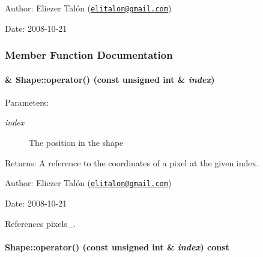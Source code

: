 \begin{Desc}
\item[Author:]Eliezer Talón (\href{mailto:elitalon@gmail.com}{\tt elitalon@gmail.com}) \end{Desc}
\begin{Desc}
\item[Date:]2008-10-21 \end{Desc}


\subsubsection{Member Function Documentation}
\hypertarget{class_shape_7d12f3a76e2bfb7963c00237eba41e0a}{
\paragraph[operator()]{ \& Shape::operator() (const unsigned int \& {\em index})}\hfill}
\label{class_shape_7d12f3a76e2bfb7963c00237eba41e0a}


\begin{Desc}
\item[Parameters:]
\begin{description}
\item[{\em index}]The position in the shape\end{description}
\end{Desc}
\begin{Desc}
\item[Returns:]A reference to the coordinates of a pixel at the given index.\end{Desc}
\begin{Desc}
\item[Author:]Eliezer Talón (\href{mailto:elitalon@gmail.com}{\tt elitalon@gmail.com}) \end{Desc}
\begin{Desc}
\item[Date:]2008-10-21 \end{Desc}


References pixels\_\-.\hypertarget{class_shape_79caae3047826779e0c8094e9882843b}{
\paragraph[operator()]{ Shape::operator() (const unsigned int \& {\em index}) const}\hfill}
\label{class_shape_79caae3047826779e0c8094e9882843b}


